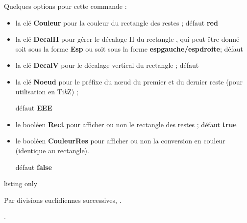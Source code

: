 \documentclass[a4paper,french,11pt]{article}
\providecommand\tikzlogo{Ti\textit{k}Z}
\let\TikZ\tikzlogo
\newcommand\Cle[1]{{\bfseries\sffamily\textlangle #1\textrangle}}
\begin{document}
\begin{cautionblock}
Quelques options pour cette commande :

\begin{itemize}
	\item la clé \Cle{Couleur} pour la couleur du \og rectangle \fg{} des restes ; \hfill{}défaut \Cle{red}
	\item la clé \Cle{DecalH} pour gérer le décalage H du \og rectangle \fg{}, qui peut être donné soit sous la forme \Cle{Esp} ou soit sous la forme \Cle{espgauche/espdroite}; \hfill{}défaut \Cle{2pt}
	\item la clé \Cle{DecalV} pour le décalage vertical du \og rectangle \fg{} ; \hfill{}défaut \Cle{3pt}
	\item la clé \Cle{Noeud} pour le préfixe du nœud du premier et du dernier reste (pour utilisation en \TikZ) ;
	
	\hfill{}défaut \Cle{EEE}
	\item le booléen \Cle{Rect} pour afficher ou non le \og rectangle \fg{} des restes ; \hfill{}défaut \Cle{true}
	\item le booléen \Cle{CouleurRes} pour afficher ou non la conversion en couleur (identique au rectangle).
	
	\hfill{}défaut \Cle{false}
\end{itemize}
\vspace*{-\baselineskip}\leavevmode
\end{cautionblock}

\begin{PresCodeTexPL}{listing only}

Par divisions euclidiennes successives, .


.
\end{PresCodeTexPL}
\end{document}
